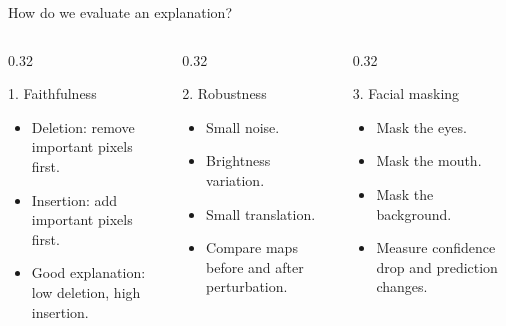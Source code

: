 \documentclass[aspectratio=169,10pt]{beamer}
\begin{document}
\begin{frame}{How do we evaluate an explanation?}
  \begin{columns}[T,totalwidth=\textwidth]
    \begin{column}{0.32\textwidth}
      \begin{block}{1. Faithfulness}
        \begin{itemize}
          \item Deletion: remove important pixels first.
          \item Insertion: add important pixels first.
          \item Good explanation: low deletion, high insertion.
        \end{itemize}
      \end{block}
    \end{column}
    \begin{column}{0.32\textwidth}
      \begin{block}{2. Robustness}
        \begin{itemize}
          \item Small noise.
          \item Brightness variation.
          \item Small translation.
          \item Compare maps before and after perturbation.
        \end{itemize}
      \end{block}
    \end{column}
    \begin{column}{0.32\textwidth}
      \begin{block}{3. Facial masking}
        \begin{itemize}
          \item Mask the eyes.
          \item Mask the mouth.
          \item Mask the background.
          \item Measure confidence drop and prediction changes.
        \end{itemize}
      \end{block}
    \end{column}
  \end{columns}
\end{frame}
\end{document}
